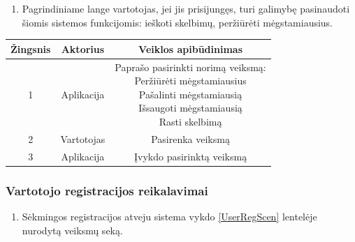 \documentclass[12pt]{article}
\begin{document}
	\begin{enumerate}[resume, labelindent=10pt,leftmargin=2.2cm]
		\item Pagrindiniame lange vartotojas, jei jis prisijungęs, turi galimybę pasinaudoti šiomis sistemos funkcijomis: ieškoti skelbimų, peržiūrėti mėgstamiausius.
	\end{enumerate}
		
		\begin{center}
		\begin{tabular}{ | c | c | c | }
			\hline
			Žingsnis & Aktorius   & Veiklos apibūdinimas \\ \hline
			1        & Aplikacija & \makecell{Paprašo pasirinkti norimą veiksmą: \\ Peržiūrėti mėgstamiausius \\ Pašalinti mėgstamiausią \\ Išsaugoti mėgstamiausią \\ Rasti skelbimą} \\ \hline
			2        & Vartotojas & Pasirenka veiksmą \\ \hline
			3        & Aplikacija & Įvykdo pasirinktą veiksmą \\ \hline
		\end{tabular}
		\end{center}		
	\pagebreak
	
	\subsubsection{Vartotojo registracijos reikalavimai}
	\begin{enumerate}[labelindent=10pt,leftmargin=2.2cm]
		\item Sėkmingos registracijos atveju sistema vykdo \ref{UserRegScen} lentelėje nurodytą veiksmų seką.
	\end{enumerate}
		
\end{document}
